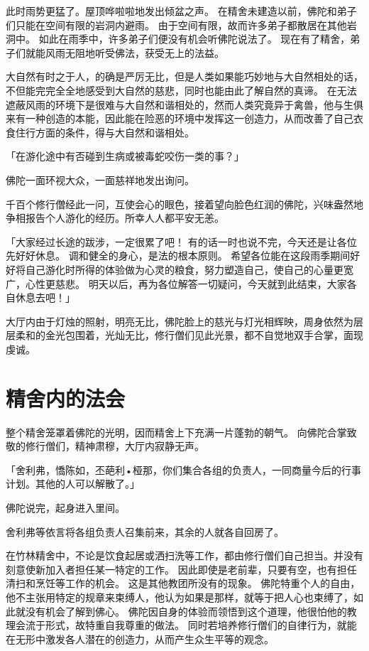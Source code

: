 \documentclass[twoside,openany]{book}
\begin{document}
此时雨势更猛了。屋顶哗啦啦地发出倾盆之声。
在精舍未建造以前，佛陀和弟子们只能在空间有限的岩洞内避雨。
由于空间有限，故而许多弟子都散居在其他岩洞中。
如此在雨季中，许多弟子们便没有机会听佛陀说法了。
现在有了精舍，弟子们就能风雨无阻地听受佛法，获受无上的法益。

大自然有时之于人，的确是严厉无比，但是人类如果能巧妙地与大自然相处的话，不但能完完全全地感受到大自然的慈悲，同时也能由此了解自然的真谛。
在无法遮蔽风雨的环境下是很难与大自然和谐相处的，然而人类究竟异于禽兽，他与生俱来有一种创造的本能，因此能在险恶的环境中发挥这一创造力，从而改善了自己衣食住行方面的条件，得与大自然和谐相处。

「在游化途中有否碰到生病或被毒蛇咬伤一类的事？」

佛陀一面环视大众，一面慈祥地发出询问。

千百个修行僧经此一问，互使会心的眼色，接着望向脸色红润的佛陀，兴味盎然地争相报告个人游化的经历。所幸人人都平安无恙。

「大家经过长途的跋涉，一定很累了吧！
有的话一时也说不完，今天还是让各位先好好休息。
调和健全的身心，是法的根本原则。
希望各位能在这段雨季期间好好将自己游化时所得的体验做为心灵的粮食，努力塑造自己，使自己的心量更宽广，心性更慈悲。
明天以后，再为各位解答一切疑问，今天就到此结束，大家各自休息去吧！」

大厅内由于灯烛的照射，明亮无比，佛陀脸上的慈光与灯光相辉映，周身依然为层层柔和的金光包围着，光灿无比，修行僧们见此光景，都不自觉地双手合掌，面现虔诚。

\section{精舍内的法会}\label{sec6.3}

整个精舍笼罩着佛陀的光明，因而精舍上下充满一片蓬勃的朝气。
向佛陀合掌致敬的修行僧们，精神肃穆，大厅内寂静无声。

「舍利弗，憍陈如，丕葩利•桠那，你们集合各组的负责人，一同商量今后的行事计划。其他的人可以解散了。」

佛陀说完，起身进入里间。

舍利弗等依言将各组负责人召集前来，其余的人就各自回房了。

在竹林精舍中，不论是饮食起居或洒扫洗等工作，都由修行僧们自己担当。并没有刻意使新加入者担任某一特定的工作。
因此即使是老前辈，只要有空，也有担任清扫和烹饪等工作的机会。
这是其他教团所没有的现象。
佛陀特重个人的自由，他不主张用特定的规章来束缚人，他认为如果是那样，就等于把人心也束缚了，如此就没有机会了解到佛心。
佛陀因自身的体验而领悟到这个道理，他很怕他的教理会流于形式，故特重自我尊重的做法。
同时若培养修行僧们的自律行为，就能在无形中激发各人潜在的创造力，从而产生众生平等的观念。
\end{document}
